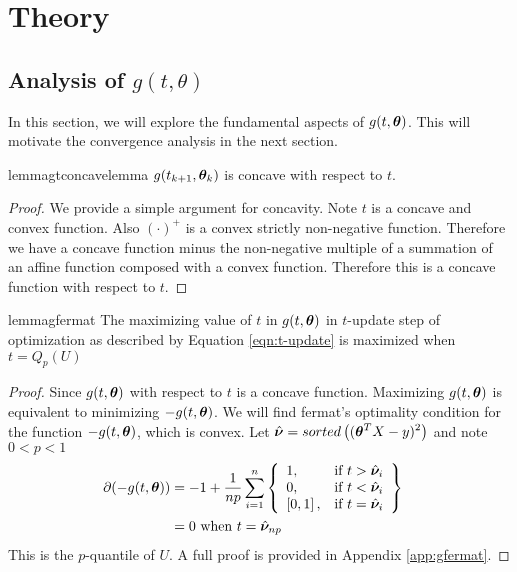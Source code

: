 \documentclass{article} %
\begin{document}
	\section{Theory} 
	
	\subsection{Analysis of $g(t,\theta)$}
	
	In this section, we will explore the fundamental aspects of $g(t,{\bm{\theta}})$. This will motivate the convergence analysis in the next section.
	
	\begin{restatable}{lemma}{gtconcavelemma}
		\label{lem:gtcomcavelemma}
		$g(t_{k+1},{\bm{\theta}}_k)$ is concave with respect to $t$.
	\end{restatable}
	\begin{proof}
		We provide a simple argument for concavity. Note $t$ is a concave and convex function. Also $(\cdot)^+$ is a convex strictly non-negative function. Therefore we have a concave function minus the non-negative multiple of a summation of an affine function composed with a convex function. Therefore this is a concave function with respect to $t$. 
	\end{proof}	
	
	\begin{restatable}{lemma}{gfermat}
		\label{lem:gfermat}
		The maximizing value of $t$ in $g(t,{\bm{\theta}})$ in $t$-update step of optimization as described by Equation \ref{eqn:t-update} is maximized when $t = Q_p(U)$
	\end{restatable}
		\begin{proof}
		Since $\displaystyle g(t,{\bm{\theta}})$ with respect to $t$ is a concave function. Maximizing $g(t,{\bm{\theta}})$ is equivalent to minimizing $-g(t,{\bm{\theta}})$. We will find fermat's optimality condition for the function $\displaystyle -g(t,{\bm{\theta}})$, which is convex. 
		Let $\displaystyle \hat{{\bm{\nu}}} = sorted\left(({\bm{\theta}}^T X - y)^2\right)$ and note $\displaystyle 0 < p < 1$
		\begin{align}
			\partial{\displaystyle (-g(t,\boldsymbol{\theta}})) 
			&= -1 + \frac{1}{np}\sum_{i=1}^{n}
			\left\{
			\begin{array}{lr}
				1, & \text{if } t > \hat{{\bm{\nu}}}_i\\
				0, & \text{if } t < \hat{{\bm{\nu}}}_i \\
				\left[0,1\right], & \text{if } t = \hat{{\bm{\nu}}}_i \\
			\end{array}
			\right\}&&\\
			&= 0 \text{ when }\displaystyle t = \hat{{\bm{\nu}}}_{np}&&
		\end{align}
		This is the $p$-quantile of $U$. A full proof is provided in Appendix \ref{app:gfermat}.
	\end{proof}
	
\end{document}
